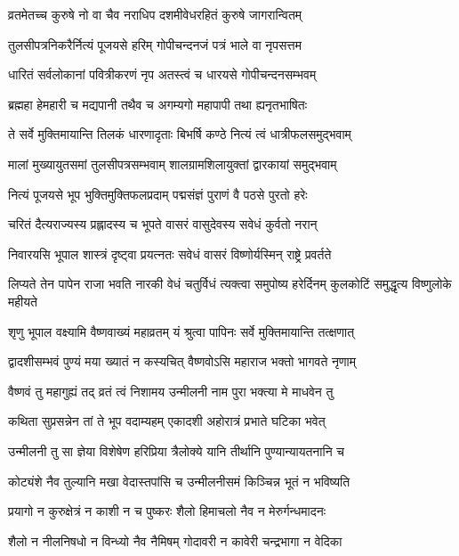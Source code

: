 \twolineshloka
{व्रतमेतच्च कुरुषे नो वा चैव नराधिप}
{दशमीवेधरहितं कुरुषे जागरान्वितम्}%

\twolineshloka
{तुलसीपत्रनिकरैर्नित्यं पूजयसे हरिम्}
{गोपीचन्दनजं पत्रं भाले वा नृपसत्तम}%

\twolineshloka
{धारितं सर्वलोकानां पवित्रीकरणं नृप}
{अतस्त्वं च धारयसे गोपीचन्दनसम्भवम्}%

\twolineshloka
{ब्रह्महा हेमहारी च मद्यपानी तथैव च}
{अगम्यगो महापापी तथा ह्यनृतभाषितः}%

\twolineshloka
{ते सर्वे मुक्तिमायान्ति तिलकं धारणादृताः}
{बिभर्षि कण्ठे नित्यं त्वं धात्रीफलसमुद्भवाम्}%

\twolineshloka
{मालां मुख्यायुतसमां तुलसीपत्रसम्भवाम्}
{शालग्रामशिलायुक्तां द्वारकायां समुद्भवाम्}%

\twolineshloka
{नित्यं पूजयसे भूप भुक्तिमुक्तिफलप्रदाम्}
{पद्मसंज्ञं पुराणं वै पठसे पुरतो हरेः}%

\twolineshloka
{चरितं दैत्यराज्यस्य प्रह्लादस्य च भूपते}
{वासरं वासुदेवस्य सवेधं कुर्वतो नरान्}%

\twolineshloka
{निवारयसि भूपाल शास्त्रं दृष्ट्वा प्रयत्नतः}
{सवेधं वासरं विष्णोर्यस्मिन् राष्ट्रे प्रवर्तते}%

\threelineshloka
{लिप्यते तेन पापेन राजा भवति नारकी}
{वेधं चतुर्विधं त्यक्त्वा समुपोष्य हरेर्दिनम्}
{कुलकोटिं समुद्धृत्य विष्णुलोके महीयते}%


\twolineshloka
{शृणु भूपाल वक्ष्यामि वैष्णवाख्यं महाव्रतम्}
{यं श्रुत्वा पापिनः सर्वे मुक्तिमायान्ति तत्क्षणात्}%

\twolineshloka
{द्वादशीसम्भवं पुण्यं मया ख्यातं न कस्यचित्}
{वैष्णवोऽसि महाराज भक्तो भागवते नृणाम्}%

\twolineshloka
{वैष्णवं तु महागुह्यं तद् व्रतं त्वं निशामय}
{उन्मीलनी नाम पुरा भक्त्या मे माधवेन तु}%

\twolineshloka
{कथिता सुप्रसन्नेन तां ते भूप वदाम्यहम्}
{एकादशी अहोरात्रं प्रभाते घटिका भवेत्}%

\twolineshloka
{उन्मीलनी तु सा ज्ञेया विशेषेण हरिप्रिया}
{त्रैलोक्ये यानि तीर्थानि पुण्यान्यायतनानि च}%

\twolineshloka
{कोट्यंशे नैव तुल्यानि मखा वेदास्तपांसि च}
{उन्मीलनीसमं किञ्चिन्न भूतं न भविष्यति}%

\twolineshloka
{प्रयागो न कुरुक्षेत्रं न काशी न च पुष्करः}
{शैलो हिमाचलो नैव न मेरुर्गन्धमादनः}%

\twolineshloka
{शैलो न नीलनिषधो न विन्ध्यो नैव नैमिषम्}
{गोदावरी न कावेरी चन्द्रभागा न वेदिका}%


